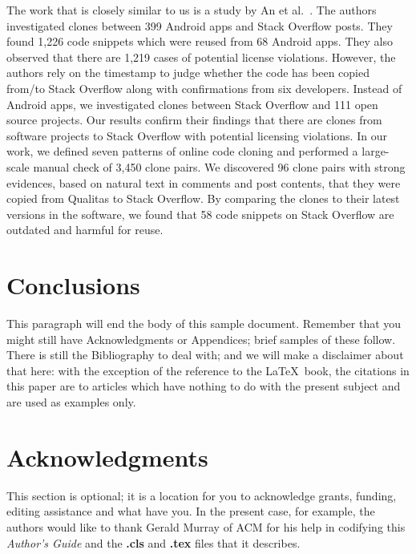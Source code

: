 \documentclass{sig-alternate-05-2015}
\begin{document}
The work that is closely similar to us is a study by An et al.~\cite{An2017}. The authors investigated clones between 399 Android apps and Stack Overflow posts. They found 1,226 code snippets which were reused from 68 Android apps. They also observed that there are 1,219 cases of potential license violations. However, the authors rely on the timestamp to judge whether the code has been copied from/to Stack Overflow along with confirmations from six developers. Instead of Android apps, we investigated clones between Stack Overflow and 111 open source projects. Our results confirm their findings that there are clones from software projects to Stack Overflow with potential licensing violations. In our work, we defined seven patterns of online code cloning and performed a large-scale manual check of 3,450 clone pairs. We discovered 96 clone pairs with strong evidences, based on natural text in comments and post contents, that they were copied from Qualitas to Stack Overflow. By comparing the clones to their latest versions in the software, we found that 58 code snippets on Stack Overflow are outdated and harmful for reuse.

\section{Conclusions}
This paragraph will end the body of this sample document.
Remember that you might still have Acknowledgments or
Appendices; brief samples of these
follow.  There is still the Bibliography to deal with; and
we will make a disclaimer about that here: with the exception
of the reference to the \LaTeX\ book, the citations in
this paper are to articles which have nothing to
do with the present subject and are used as
examples only.

\section{Acknowledgments}
This section is optional; it is a location for you
to acknowledge grants, funding, editing assistance and
what have you.  In the present case, for example, the
authors would like to thank Gerald Murray of ACM for
his help in codifying this \textit{Author's Guide}
and the \textbf{.cls} and \textbf{.tex} files that it describes.
\end{document}
